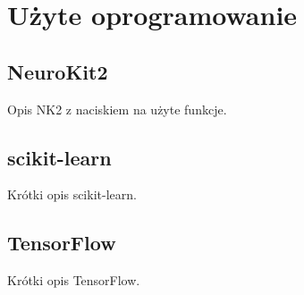 \chapter{Użyte oprogramowanie}\label{ch:uzyte-oprogramowanie}

\section{NeuroKit2}\label{sec:neurokit2}
Opis NK2 z naciskiem na użyte funkcje.


\section{scikit-learn}\label{sec:scikit-learn}
Krótki opis scikit-learn.


\section{TensorFlow}\label{sec:tensorflow}
Krótki opis TensorFlow.
